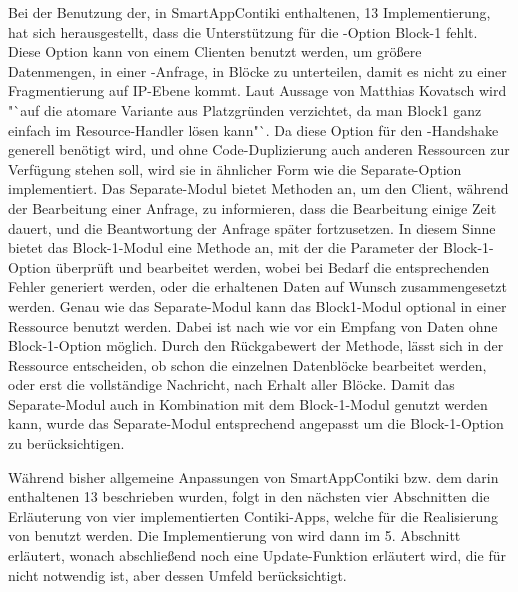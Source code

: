 Bei der Benutzung der, in SmartAppContiki enthaltenen,  13 Implementierung, hat sich herausgestellt, dass die Unterstützung für die -Option
Block-1 fehlt. Diese Option kann von einem Clienten benutzt werden, um größere Datenmengen, in einer -Anfrage, in Blöcke zu unterteilen, damit es nicht
zu einer Fragmentierung auf IP-Ebene kommt. Laut Aussage von Matthias Kovatsch wird "`auf die atomare Variante aus Platzgründen verzichtet, da man Block1 ganz
einfach im Resource-Handler lösen kann"`. Da diese Option für den -Handshake generell benötigt wird, und ohne Code-Duplizierung auch anderen Ressourcen
zur Verfügung stehen soll, wird sie in ähnlicher Form wie die Separate-Option implementiert. Das Separate-Modul bietet Methoden an, um den Client, während der
Bearbeitung einer Anfrage, zu informieren, dass die Bearbeitung einige Zeit dauert, und die Beantwortung der Anfrage später fortzusetzen. In diesem Sinne bietet
das Block-1-Modul eine Methode an, mit der die Parameter der Block-1-Option überprüft und bearbeitet werden, wobei bei Bedarf die entsprechenden Fehler generiert
werden, oder die erhaltenen Daten auf Wunsch zusammengesetzt werden. Genau wie das Separate-Modul kann das Block1-Modul optional in einer Ressource benutzt werden.
Dabei ist nach wie vor ein Empfang von Daten ohne Block-1-Option möglich. Durch den Rückgabewert der Methode, lässt sich in der Ressource entscheiden, ob schon
die einzelnen Datenblöcke bearbeitet werden, oder erst die vollständige Nachricht, nach Erhalt aller Blöcke. Damit das Separate-Modul auch in Kombination mit dem
Block-1-Modul genutzt werden kann, wurde das Separate-Modul entsprechend angepasst um die Block-1-Option zu berücksichtigen.

Während bisher allgemeine Anpassungen von SmartAppContiki bzw. dem darin enthaltenen  13 beschrieben wurden, folgt in den nächsten vier Abschnitten
die Erläuterung von vier implementierten Contiki-Apps, welche für die Realisierung von  benutzt werden. Die Implementierung von  wird dann
im 5. Abschnitt erläutert, wonach abschließend noch eine Update-Funktion erläutert wird, die für  nicht notwendig ist, aber dessen Umfeld berücksichtigt.






